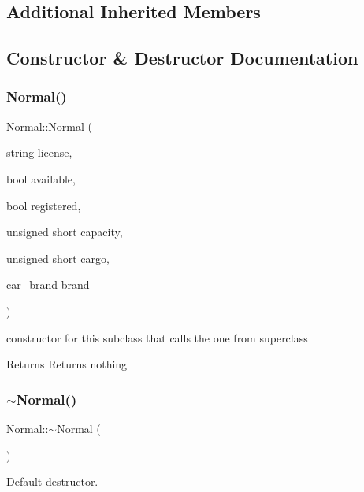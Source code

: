 \subsection*{Additional Inherited Members}


\subsection{Constructor \& Destructor Documentation}
\mbox{\label{class_normal_a76c1e0e53ac33cf89fc9969de59a122e}} 
\subsubsection{\texorpdfstring{Normal()}{Normal()}}
{\footnotesize\ttfamily Normal\+::\+Normal (\begin{DoxyParamCaption}\item[{string}]{license,  }\item[{bool}]{available,  }\item[{bool}]{registered,  }\item[{unsigned short}]{capacity,  }\item[{unsigned short}]{cargo,  }\item[{car\+\_\+brand}]{brand }\end{DoxyParamCaption})}



constructor for this subclass that calls the one from superclass 

\begin{DoxyReturn}{Returns}
Returns nothing 
\end{DoxyReturn}
\mbox{\label{class_normal_a2ed547e3b7361c3675224d352cf79740}} 
\subsubsection{\texorpdfstring{$\sim$\+Normal()}{~Normal()}}
{\footnotesize\ttfamily Normal\+::$\sim$\+Normal (\begin{DoxyParamCaption}{ }\end{DoxyParamCaption})\hspace{0.3cm}{\ttfamily [inline]}}



Default destructor. 


